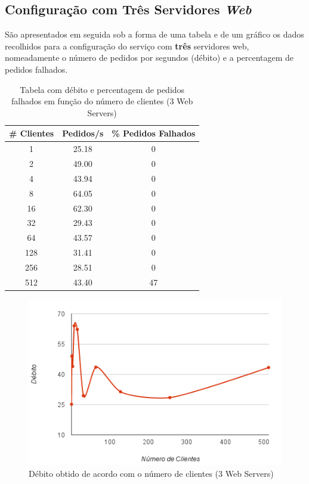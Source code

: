 \newpage
\subsection{Configuração com Três Servidores \textit{Web}}


São apresentados em seguida sob a forma de uma tabela e de um gráfico os dados recolhidos para a configuração do serviço com \textbf{três} servidores web, nomeadamente o número de pedidos por segundos (débito) e a percentagem de pedidos falhados. \\

\begin{table}[!h]
\centering
\begin{tabular}{|c|c|c|}
\hline
\textbf{\# Clientes} & \textbf{Pedidos/s} & \textbf{\% Pedidos Falhados} \\ \hline
1 & 25.18 & 0 \\ \hline
2 & 49.00 & 0 \\ \hline
4 & 43.94 & 0 \\ \hline
8 & 64.05 & 0 \\ \hline
16 & 62.30 & 0 \\ \hline
32 & 29.43 & 0 \\ \hline
64 & 43.57 & 0 \\ \hline
128 & 31.41 & 0 \\ \hline
256 & 28.51 & 0 \\ \hline
512 & 43.40 & 47 \\ \hline
\end{tabular}
\caption{Tabela com débito e percentagem de pedidos falhados em função do número de clientes (3 Web Servers)}
\end{table}

\begin{figure}[!h]
\centering
\includegraphics[scale=.6]{img/ab/web3.png}
\caption{Débito obtido de acordo com o número de clientes (3 Web Servers)}
\end{figure}

